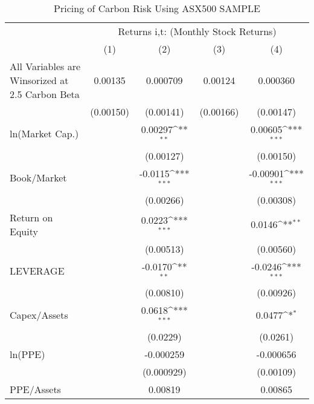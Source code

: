 \begin{table}[htbp]\centering
\def\sym#1{\ifmmode^{#1}\else\(^{#1}\)\fi}
\caption{Pricing of Carbon Risk Using ASX500 SAMPLE}
\begin{tabular}{l*{4}{c}}
\hline\hline
                &\multicolumn{4}{c}{Returns i,t: (Monthly Stock Returns) }                  \\\cmidrule(lr){2-5}
                &\multicolumn{1}{c}{(1)}         &\multicolumn{1}{c}{(2)}         &\multicolumn{1}{c}{(3)}         &\multicolumn{1}{c}{(4)}         \\
All Variables are Winsorized at 2.5%
Carbon Beta     &  0.00135         & 0.000709         &  0.00124         & 0.000360         \\
                &(0.00150)         &(0.00141)         &(0.00166)         &(0.00147)         \\
ln(Market Cap.) &                  &  0.00297\sym{**} &                  &  0.00605\sym{***}\\
                &                  &(0.00127)         &                  &(0.00150)         \\
Book/Market     &                  &  -0.0115\sym{***}&                  & -0.00901\sym{***}\\
                &                  &(0.00266)         &                  &(0.00308)         \\
Return on Equity&                  &   0.0223\sym{***}&                  &   0.0146\sym{**} \\
                &                  &(0.00513)         &                  &(0.00560)         \\
LEVERAGE        &                  &  -0.0170\sym{**} &                  &  -0.0246\sym{***}\\
                &                  &(0.00810)         &                  &(0.00926)         \\
Capex/Assets    &                  &   0.0618\sym{***}&                  &   0.0477\sym{*}  \\
                &                  & (0.0229)         &                  & (0.0261)         \\
ln(PPE)         &                  &-0.000259         &                  &-0.000656         \\
                &                  &(0.000929)         &                  &(0.00109)         \\
PPE/Assets      &                  &  0.00819         &                  &  0.00865         \\

\end{tabular}
\end{table}
